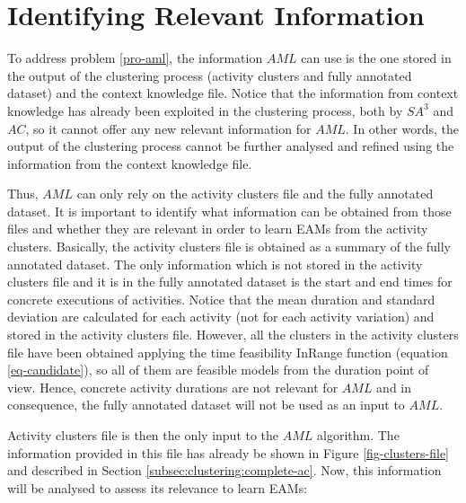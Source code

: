 \section{Identifying Relevant Information}
\label{sec:learner:relevant}


To address problem \ref{pro-aml}, the information $AML$ can use is the one stored in the output of the clustering process (activity clusters and fully annotated dataset) and the context knowledge file. Notice that the information from context knowledge has already been exploited in the clustering process, both by $SA^3$ and $AC$, so it cannot offer any new relevant information for $AML$. In other words, the output of the clustering process cannot be further analysed and refined using the information from the context knowledge file.

Thus, $AML$ can only rely on the activity clusters file and the fully annotated dataset. It is important to identify what information can be obtained from those files and whether they are relevant in order to learn EAMs from the activity clusters. Basically, the activity clusters file is obtained as a summary of the fully annotated dataset. The only information which is not stored in the activity clusters file and it is in the fully annotated dataset is the start and end times for concrete executions of activities. Notice that the mean duration and standard deviation are calculated for each activity (not for each activity variation) and stored in the activity clusters file. However, all the clusters in the activity clusters file have been obtained applying the time feasibility InRange function (equation \ref{eq-candidate}), so all of them are feasible models from the duration point of view. Hence, concrete activity durations are not relevant for $AML$ and in consequence, the fully annotated dataset will not be used as an input to $AML$.

Activity clusters file is then the only input to the $AML$ algorithm. The information provided in this file has already be shown in Figure \ref{fig-clusters-file} and described in Section \ref{subsec:clustering:complete-ac}. Now, this information will be analysed to assess its relevance to learn EAMs:

